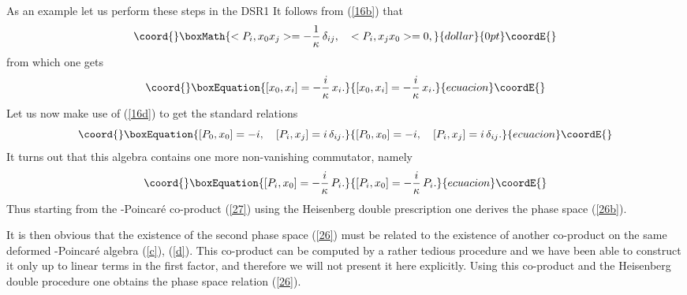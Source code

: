 \documentclass  [12pt] {article}
\begin{document}
As an example let us perform these steps in the DSR1
It follows from (\ref{16b}) that
$$\coord{}\boxMath{
<P_i, x_0 x_j> = -\frac1\kappa\, \delta_{ij}, \quad <P_i,  x_jx_0>=0,
}{dollar}{0pt}\coordE{}$$
from which one gets
\begin{equation}\coord{}\boxEquation{\label{17a}
[x_0, x_i] = -\frac{i}\kappa\, x_i.
}{[x_0, x_i] = -\frac{i}\kappa\, x_i.
}{ecuacion}\coordE{}\end{equation}
Let us now make use of (\ref{16d}) to get the standard relations
\begin{equation}\coord{}\boxEquation{\label{17b}
[P_0, x_0] = -i, \quad [P_i, x_j] = i \, \delta_{ij}.
}{[P_0, x_0] = -i, \quad [P_i, x_j] = i \, \delta_{ij}.
}{ecuacion}\coordE{}\end{equation}
It turns out that this algebra contains one more non-vanishing commutator,
namely
\begin{equation}\coord{}\boxEquation{\label{17c}
 [P_i, x_0] = -\frac{i}\kappa\, P_i.
}{[P_i, x_0] = -\frac{i}\kappa\, P_i.
}{ecuacion}\coordE{}\end{equation}
Thus starting from the \myHighlight{$\kappa$}\coordHE{}-Poincar\'e co-product (\ref{27})  using the
Heisenberg double prescription one derives the phase space (\ref{26b}).

It is then obvious that the existence of the second phase space
(\ref{26}) must be related to the existence of another co-product
on the same deformed \myHighlight{$\kappa$}\coordHE{}-Poincar\'e algebra (\ref{c}),
(\ref{d}). This co-product can be computed by a rather tedious
procedure and we have been able to construct it only up to linear
terms in the first factor, and therefore we will not present it
here explicitly. Using this co-product and the Heisenberg double
procedure one obtains the phase space relation (\ref{26}).
\newline
\end{document}
